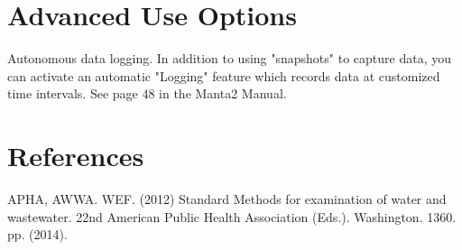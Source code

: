 \documentclass[12pt]{../SOP3_beta}\usepackage[]{graphicx}\usepackage[]{color}
\begin{document}
\section{Advanced Use Options}

 \NP Autonomous data logging. In addition to using "snapshots" to capture data, you can activate an automatic "Logging" feature which records data at customized time intervals. See page 48 in the Manta2 Manual.

\section{References}

\NP APHA, AWWA. WEF. (2012) Standard Methods for examination of water and wastewater. 22nd American Public Health Association (Eds.). Washington. 1360. pp. (2014).
\end{document}
